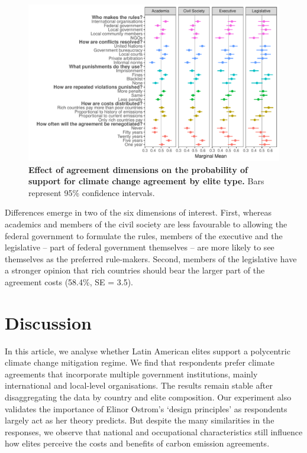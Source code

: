 \documentclass[a4paper,12pt]{article}
\begin{document}
\begin{figure}[H]
	\centering
	\includegraphics[width=\linewidth]{types.pdf}
	\caption{\textbf{Effect of agreement dimensions on the probability of support for climate change agreement by elite type.} Bars represent 95\% confidence intervals.}
	\label{fig:types}
\end{figure}

Differences emerge in two of the six dimensions of interest. First, whereas academics and members of the civil society are less favourable to allowing the federal government to formulate the rules, members of the executive and the legislative -- part of federal government themselves -- are more likely to see themselves as the preferred rule-makers. Second, members of the legislative have a stronger opinion that rich countries should bear the larger part of the agreement costs (58.4\%, SE = 3.5). 

\section*{Discussion}
\label{sec:discussion}

In this article, we analyse whether Latin American elites support a polycentric climate change mitigation regime. We find that respondents prefer climate agreements that incorporate multiple government institutions, mainly international and local-level organisations. The results remain stable after disaggregating the data by country and elite composition. Our experiment also validates the importance of Elinor Ostrom's `design principles' as respondents largely act as her theory predicts. But despite the many similarities in the responses, we observe that national and occupational characteristics still influence how elites perceive the costs and benefits of carbon emission agreements.
\end{document}
